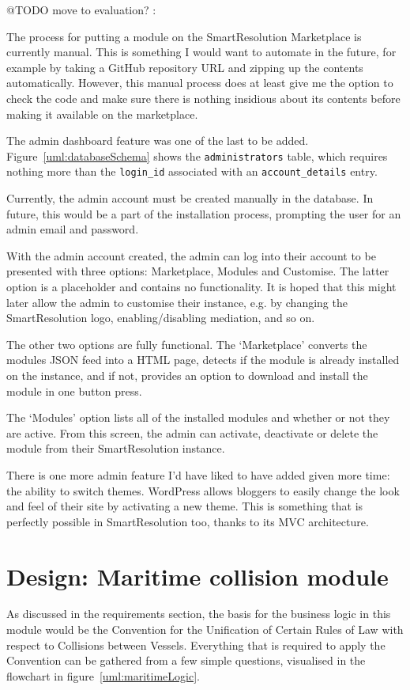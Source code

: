 @TODO move to evaluation? :

The process for putting a module on the SmartResolution Marketplace is currently manual. This is something I would want to automate in the future, for example by taking a GitHub repository URL and zipping up the contents automatically. However, this manual process does at least give me the option to check the code and make sure there is nothing insidious about its contents before making it available on the marketplace.

The admin dashboard feature was one of the last to be added. Figure~\ref{uml:databaseSchema} shows the \lstinline{administrators} table, which requires nothing more than the \lstinline{login_id} associated with an \lstinline{account_details} entry.

Currently, the admin account must be created manually in the database. In future, this would be a part of the installation process, prompting the user for an admin email and password.

With the admin account created, the admin can log into their account to be presented with three options: Marketplace, Modules and Customise. The latter option is a placeholder and contains no functionality. It is hoped that this might later allow the admin to customise their instance, e.g. by changing the SmartResolution logo, enabling/disabling mediation, and so on.

The other two options are fully functional. The `Marketplace' converts the modules JSON feed into a HTML page, detects if the module is already installed on the instance, and if not, provides an option to download and install the module in one button press.

The `Modules' option lists all of the installed modules and whether or not they are active. From this screen, the admin can activate, deactivate or delete the module from their SmartResolution instance.

There is one more admin feature I'd have liked to have added given more time: the ability to switch themes. WordPress allows bloggers to easily change the look and feel of their site by activating a new theme. This is something that is perfectly possible in SmartResolution too, thanks to its MVC architecture.

\section{Design: Maritime collision module}

As discussed in the requirements section, the basis for the business logic in this module would be the Convention for the Unification of Certain Rules of Law with respect to Collisions between Vessels. Everything that is required to apply the Convention can be gathered from a few simple questions, visualised in the flowchart in figure~\ref{uml:maritimeLogic}.

